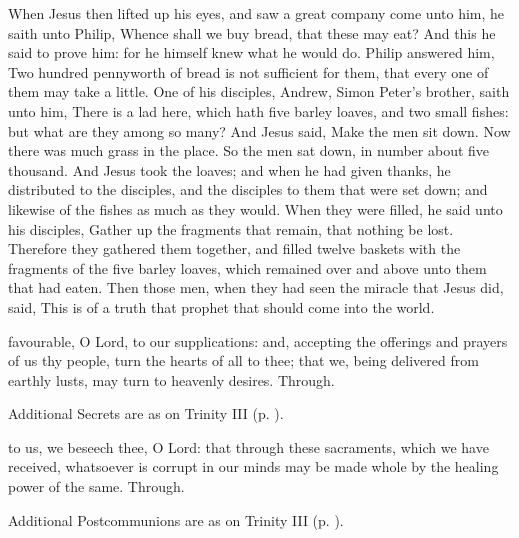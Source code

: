 
\vspace{-2ex}
 When Jesus then lifted up his eyes, and saw a great company come unto him, he saith unto Philip, Whence shall we buy bread, that these may eat? And this he said to prove him: for he himself knew what he would do. Philip answered him, Two hundred pennyworth of bread is not sufficient for them, that every one of them may take a little. One of his disciples, Andrew, Simon Peter's brother, saith unto him, There is a lad here, which hath five barley loaves, and two small fishes: but what are they among so many? And Jesus said, Make the men sit down. Now there was much grass in the place. So the men sat down, in number about five thousand. And Jesus took the loaves; and when he had given thanks, he distributed to the disciples, and the disciples to them that were set down; and likewise of the fishes as much as they would. When they were filled, he said unto his disciples, Gather up the fragments that remain, that nothing be lost. Therefore they gathered them together, and filled twelve baskets with the fragments of the five barley loaves, which remained over and above unto them that had eaten. Then those men, when they had seen the miracle that Jesus did, said, This is of a truth that prophet that should come into the world.


\vspace{-2ex}
\secret
\vspace{-0.5ex}
 favourable, O Lord, to our supplications: and, accepting the offerings and prayers of us thy people, turn the hearts of all to thee; that we, being delivered from earthly lusts, may turn to heavenly desires. Through.
\vspace{-0.5ex}
\begin{rubric}
    Additional Secrets are as on Trinity III (p. \pageref{TrinityIII}).
\end{rubric}

\vspace{-1.5ex}

\vspace{-1.5ex}
 to us, we beseech thee, O Lord: that through these sacraments, which we have received, whatsoever is corrupt in our minds may be made whole by the healing power of the same. Through.
\vspace{-0.5ex}
\begin{rubric}
    Additional Postcommunions are as on Trinity III (p. \pageref{TrinityIII}).
\end{rubric}